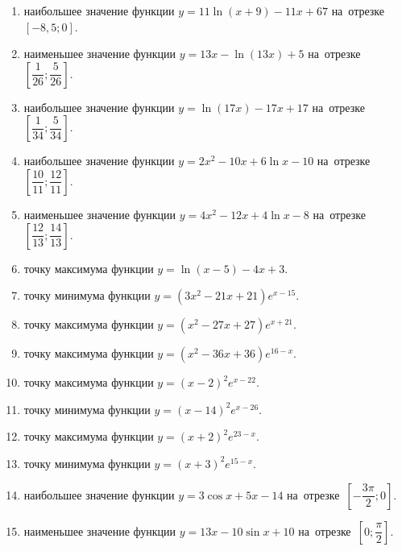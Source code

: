 \documentclass[a4paper,10pt]{article}
\begin{document}
\begin{enumerate}
\item {} наибольшее значение функции $y = 11\ln \left(x+9\right)-11x +67$ на~отрезке~$\left[-8,5;0\right]$.

\item {} наименьшее значение функции $y = 13x-\ln \left(13x\right)+5$ на~отрезке~$\left[\dfrac{1}{26};\dfrac{5}{26}\right]$.

\item {} наибольшее значение функции $y = \ln \left(17x\right)-17x+17$ на~отрезке~$\left[\dfrac{1}{34};\dfrac{5}{34}\right]$.

\item {} наибольшее значение функции $y=2x^2-10x+6\ln x-10$ на~отрезке~$\left[\dfrac{10}{11};\dfrac{12}{11}\right]$.

\item {} наименьшее значение функции $y=4x^2-12x+4\ln x-8$ на~отрезке~$\left[\dfrac{12}{13};\dfrac{14}{13}\right]$.

\item {} точку максимума функции $y=\ln \left(x-5\right)-4x+3$.

\item {} точку минимума функции $y=\left(3x^2-21x+21\right)e^{x-15}$.

\item {} точку максимума функции $y=\left(x^2-27x+27\right)e^{x+21}$.

\item {} точку максимума функции $y=\left(x^2-36x+36\right)e^{16-x}$.

\item {} точку максимума функции $y=\left(x -2\right)^2e^{x-22}$.

\item {} точку минимума функции $y=\left(x -14\right)^2e^{x-26}$.

\item {} точку максимума функции $y=\left(x +2\right)^2e^{23-x}$.

\item {} точку минимума функции $y=\left(x +3\right)^2e^{15-x}$.

\item {} наибольшее значение функции $y=3\cos x+5x -14$ на~отрезке~$\left[-\dfrac{3\pi }{2};0\right]$.

\item {} наименьшее значение функции $y=13x-10\sin x +10$ на~отрезке~$\left[0;\dfrac{\pi }{2}\right]$.


\end{enumerate}
\end{document}
